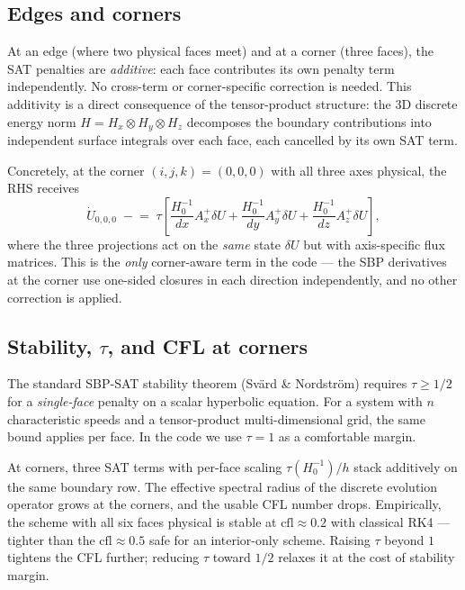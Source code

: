 \documentclass[11pt]{article}
\begin{document}
\subsection{Edges and corners}

At an edge (where two physical faces meet) and at a corner (three
faces), the SAT penalties are \emph{additive}: each face contributes
its own penalty term independently. No cross-term or corner-specific
correction is needed. This additivity is a direct consequence of the
tensor-product structure: the 3D discrete energy norm
$H = H_x \otimes H_y \otimes H_z$ decomposes the boundary contributions
into independent surface integrals over each face, each cancelled by
its own SAT term.

Concretely, at the corner $(i, j, k) = (0, 0, 0)$ with all three axes
physical, the RHS receives
\begin{equation}
  \dot U_{0,0,0} \;\mathrel{-}=\; \tau \left[
    \frac{H^{-1}_{0}}{dx} A_x^+ \delta U +
    \frac{H^{-1}_{0}}{dy} A_y^+ \delta U +
    \frac{H^{-1}_{0}}{dz} A_z^+ \delta U
  \right],
  \label{eq:corner-sat}
\end{equation}
where the three projections act on the \emph{same} state $\delta U$ but
with axis-specific flux matrices. This is the \emph{only} corner-aware
term in the code — the SBP derivatives at the corner use one-sided
closures in each direction independently, and no other correction is
applied.

\subsection{Stability, $\tau$, and CFL at corners}
\label{sec:stability-tau}

The standard SBP-SAT stability theorem (Svärd \& Nordström) requires
$\tau \geq 1/2$ for a \emph{single-face} penalty on a scalar hyperbolic
equation. For a system with $n$ characteristic speeds and a tensor-product
multi-dimensional grid, the same bound applies per face. In the code
we use $\tau = 1$ as a comfortable margin.

At corners, three SAT terms with per-face scaling $\tau (H^{-1}_0)/h$
stack additively on the same boundary row. The effective spectral
radius of the discrete evolution operator grows at the corners, and
the usable CFL number drops. Empirically, the scheme with all six
faces physical is stable at $\mathrm{cfl} \approx 0.2$ with classical
RK4 — tighter than the $\mathrm{cfl} \approx 0.5$ safe for an
interior-only scheme. Raising $\tau$ beyond $1$ tightens the CFL
further; reducing $\tau$ toward $1/2$ relaxes it at the cost of
stability margin.
\end{document}
